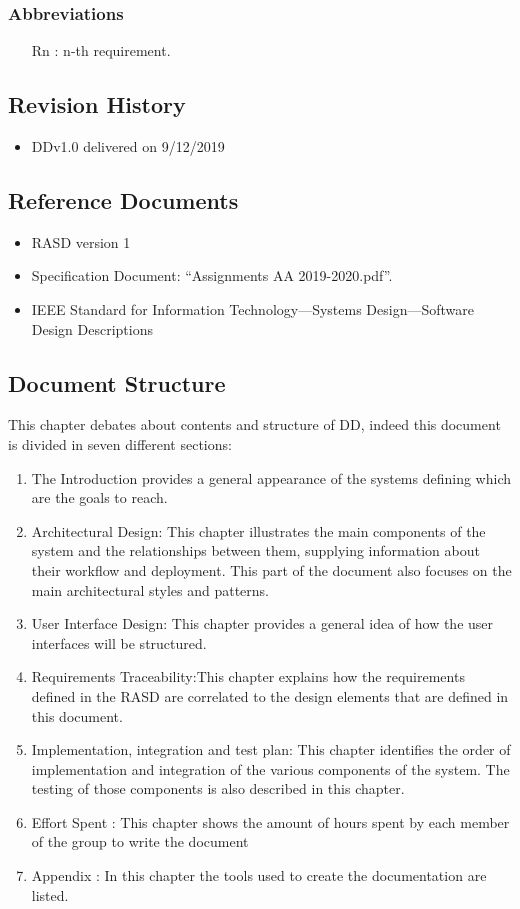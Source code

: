 	\subsubsection {Abbreviations}
\begin{itemize}
\item	[Rn]: n-th requirement.
\end{itemize}
\subsection {Revision History}
\begin{itemize}
\item	DDv1.0 delivered on 9/12/2019
\end{itemize}
\subsection {Reference Documents}
\begin{itemize}
\item 	RASD version 1
\item	Specification Document: “Assignments AA 2019-2020.pdf”.
\item	IEEE Standard for Information Technology—Systems Design—Software Design Descriptions
\end{itemize}
\subsection{Document Structure}
This chapter debates about contents and structure of DD, indeed this document is divided in seven different sections:
\begin{enumerate}
\item	The Introduction provides a general appearance of the systems defining which are the goals to reach.
\item Architectural Design: This chapter illustrates the main components of the system and the relationships between them, supplying information about their workflow and deployment. This part of the document also focuses on the main architectural styles and patterns.
\item User Interface Design: This chapter provides a general idea of how the user interfaces will be structured.
\item  Requirements Traceability:This chapter explains how the requirements defined in the RASD are correlated to the design elements that are defined in this document.
\item  Implementation, integration and test plan: This chapter identifies the order of implementation and integration of the various components of the system. The testing of those components is also described in this chapter.
\item  Effort Spent : This chapter shows the amount of hours spent by each member of the group to write the document
\item  Appendix : In this chapter the tools used to create the documentation are listed.
\end{enumerate}
